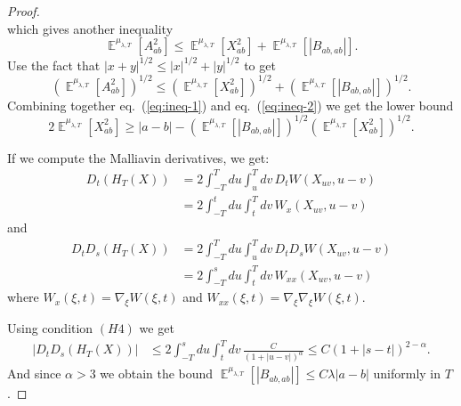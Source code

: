 \documentclass[a4paper,12pt,reqno]{amsart}
\DeclareMathOperator{\expect}{{\mathbb E}}
\begin{document}
\begin{proof}
\begin{equation}
\end{equation}
which gives another  inequality
\begin{equation*}
\expect^{\mu_{\lambda,T}} [ A_{ab}^2] \le \expect^{\mu_{\lambda,T}} [X_{ab}^2 ] +  \expect^{\mu_{\lambda,T}} [ |B_{ab,ab}|]. 
\end{equation*}
Use the fact that $|x+y|^{1/2} \le |x|^{1/2} + |y|^{1/2}$ to get
\begin{equation}
\label{eq:ineq-2}
\left(\expect^{\mu_{\lambda,T}} [ A_{ab}^2]\right)^{1/2} \le \left(\expect^{\mu_{\lambda,T}} [X_{ab}^2 ]\right)^{1/2} + \left( \expect^{\mu_{\lambda,T}} [ |B_{ab,ab}|]\right)^{1/2}. 
\end{equation}
Combining together eq.~(\ref{eq:ineq-1}) and eq.~(\ref{eq:ineq-2}) we get the lower bound
\begin{equation}
\label{eq:bound-fin-1}
 2 \expect^{\mu_{\lambda,T}} [X_{ab}^2 ] \ge 
|a-b| - \left( \expect^{\mu_{\lambda,T}} [ |B_{ab,ab}|]\right)^{1/2} 
\left(\expect^{\mu_{\lambda,T}}[ X_{ab}^2]\right)^{1/2}. 
\end{equation}

If we compute the Malliavin derivatives, we get:
\begin{equation}
  \begin{split}
  D_{t} (H_T(X)) & = 2 \int_{-T}^T du \int_{u}^T dv \, D_t 
  W(X_{uv},u-v)    
\\ & = 2 \int_{-T}^{t} du \int_{t}^{T} dv \,
  W_{x}(X_{uv},u-v)    
  \end{split}
\end{equation}
and
\begin{equation}
  \begin{split}
  D_{t} D_{s}(H_T(X)) & = 2 \int_{-T}^T du \int_{u}^T dv \, D_t D_s
  W(X_{uv},u-v)    
\\ & = 2 \int_{-T}^{s} du \int_{t}^{T} dv \,
  W_{xx}(X_{uv},u-v)    
  \end{split}
\end{equation}
where $W_{x}(\xi,t) = \nabla_\xi W(\xi,t)$ and $W_{xx}(\xi,t) = \nabla_\xi \nabla_\xi W(\xi,t)$.

Using condition $(H4)$ we get
\begin{equation}
  \begin{split}
|  D_{t} D_{s}(H_T(X))| & \le
 2 \int_{-T}^{s} du \int_{t}^{T} dv \, \frac{C}{(1+|u-v|)^{\alpha}}
 \le
 C (1+|s-t|)^{2-\alpha}.
   \end{split}
\end{equation}
And since $\alpha > 3$ we obtain the bound
$
 \expect^{\mu_{\lambda,T}} [ |B_{ab,ab}|] \le C\lambda  |a-b|
$
uniformly in $T$.


\end{proof}
\end{document}
